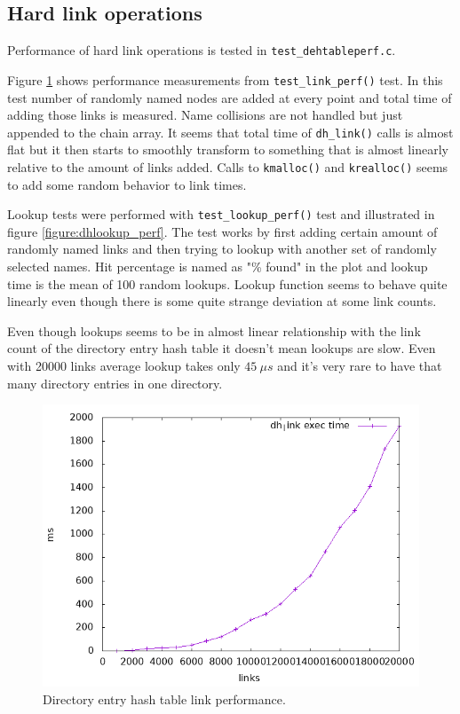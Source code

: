 \subsection{Hard link operations}

Performance of hard link operations is tested in \verb+test_dehtableperf.c+.

Figure \ref{figure:dhlink_perf} shows performance measurements from
\verb+test_link_perf()+ test. In this test number of randomly named nodes are
added at every point and total time of adding those links is measured.
Name collisions are not handled but just appended to the chain array.
It seems that total time of \verb+dh_link()+ calls is almost flat but
it then starts to smoothly transform to something that is almost linearly
relative to the amount of links added. Calls to \verb+kmalloc()+ and
\verb+krealloc()+ seems to add some random behavior to link times.

Lookup tests were performed with \verb+test_lookup_perf()+ test and illustrated
in figure \ref{figure:dhlookup_perf}. The test works by first adding certain
amount of randomly named links and then trying to lookup with another set of
randomly selected names. Hit percentage is named as "\% found" in the plot and
lookup time is the mean of 100 random lookups. Lookup function seems to behave
quite linearly even though there is some quite strange deviation at some link
counts.

Even though lookups seems to be in almost linear relationship with the link
count of the directory entry hash table it doesn't mean lookups are slow.
Even with 20000 links average lookup takes only $45\:\mu s$ and it's very
rare to have that many directory entries in one directory.

\begin{figure}
  \includegraphics[width=15cm]{plots/dh_link}
  \centering
  \caption{Directory entry hash table link performance.}
  \label{figure:dhlink_perf}
\end{figure}

